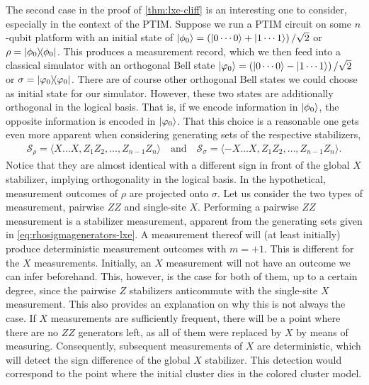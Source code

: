 The second case in the proof of \cref{thm:lxe-cliff} is an interesting one to
consider, especially in the context of the PTIM. Suppose we run a PTIM circuit
on some $n$-qubit platform with an initial state of $\ket{\phi_0} = \left( \ket{0\cdots 0} +
\ket{1\cdots 1} \right) / \sqrt{2}$ or $\rho = \dyad{\phi_0}$. This produces a measurement record, which we
then feed into a classical simulator with an orthogonal Bell state
$\ket{\varphi_0} = \left( \ket{0\cdots 0} - \ket{1\cdots 1} \right) / \sqrt{2}$
or $\sigma = \dyad{\varphi_0}$.
There are of course other orthogonal Bell states we could choose as initial
state for our simulator. However, these two states are additionally orthogonal
in the logical basis. That is, if we encode information in $\ket{\phi_0}$, the
opposite information is encoded in $\ket{\varphi_0}$. That this choice is a
reasonable one gets even more apparent when considering generating sets of the
respective stabilizers,
\begin{align}\label{eq:rhosigmagenerators-lxe}
  \mathcal{S}_\rho = \langle X\ldots X, Z_1Z_2,\ldots,Z_{n-1}Z_n\rangle \quad{\text{and}}
  \quad
  \mathcal{S}_\sigma = \langle -X\ldots X, Z_1Z_2,\ldots,Z_{n-1}Z_n\rangle
.\end{align}
Notice that they are almost identical with a different sign in front of the
global $X$ stabilizer, implying orthogonality in the logical basis. In the
hypothetical, measurement outcomes of $\rho$ are projected onto $\sigma$.
Let us consider the two types of measurement, pairwise $ZZ$ and single-site
$X$. Performing a pairwise $ZZ$ measurement is a stabilizer measurement,
apparent from the generating sets given in \cref{eq:rhosigmagenerators-lxe}. A
measurement thereof will (at least initially) produce deterministic measurement
outcomes with $m = +1$. This is different for the $X$ measurements. Initially,
an $X$ measurement will not have an outcome we can infer beforehand. This,
however, is the case for both of them, up to a certain degree, since the
pairwise $Z$ stabilizers anticommute with the single-site $X$ measurement. This
also provides an explanation on why this is not always the case. If $X$
measurements are sufficiently frequent, there will be a point where there are
no $ZZ$ generators left, as all of them were replaced by $X$ by means of
measuring. Consequently, subsequent measurements of $X$ are deterministic,
which will detect the sign difference of the global $X$ stabilizer. This
detection would correspond to the point where the initial cluster dies in the
colored cluster model.

